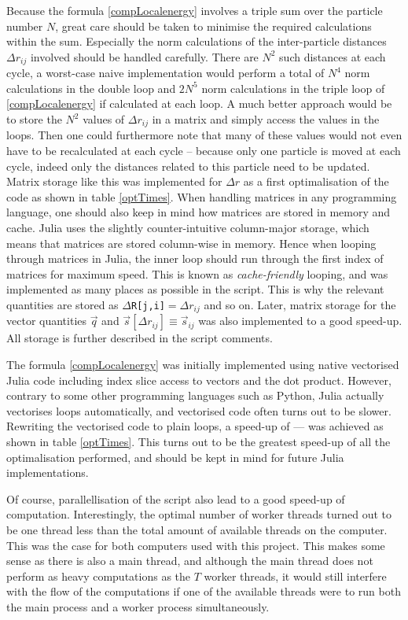 \documentclass[a4paper,8pt]{article}
\begin{document}
\begin{multicols}{2}
Because the formula \eqref{compLocalenergy} involves a triple sum over the particle number $N$, great care should be taken to minimise the required calculations within the sum. Especially the norm calculations of the inter-particle distances $\Delta r_{ij}$ involved should be handled carefully. There are $N^2$ such distances at each cycle, a worst-case naive implementation would perform a total of $N^4$ norm calculations in the double loop and $2N^5$ norm calculations in the triple loop of \eqref{compLocalenergy} if calculated at each loop. A much better approach would be to store the $N^2$ values of $\Delta r_{ij}$ in a matrix and simply access the values in the loops. Then one could furthermore note that many of these values would not even have to be recalculated at each cycle -- because only one particle is moved at each cycle, indeed only the distances related to this particle need to be updated. Matrix storage like this was implemented for $\Delta r$ as a first optimalisation of the code as shown in table \ref{optTimes}. When handling matrices in any programming language, one should also keep in mind how matrices are stored in memory and cache. Julia uses the slightly counter-intuitive column-major storage, which means that matrices are stored column-wise in memory. Hence when looping through matrices in Julia, the inner loop should run through the first index of matrices for maximum speed. This is known as \textit{cache-friendly} looping, and was implemented as many places as possible in the script. This is why the relevant quantities are stored as \texttt{$\Delta$R[j,i]}$ = \Delta{r}_{ij}$ and so on. Later, matrix storage for the vector quantities $\vec{q}$ and $\vec{s}[\Delta r_{ij}] \equiv \vec{s}_{ij}$ was also implemented to a good speed-up. All storage is further described in the script comments.

The formula \eqref{compLocalenergy} was initially implemented using native vectorised Julia code including index slice access to vectors and the dot product. However, contrary to some other programming languages such as Python, Julia actually vectorises loops automatically, and vectorised code often turns out to be slower. Rewriting the vectorised code to plain loops, a speed-up of --- was achieved as shown in table \ref{optTimes}. This turns out to be the greatest speed-up of all the optimalisation performed, and should be kept in mind for future Julia implementations.

Of course, parallellisation of the script also lead to a good speed-up of computation. Interestingly, the optimal number of worker threads turned out to be one thread less than the total amount of available threads on the computer. This was the case for both computers used with this project. This makes some sense as there is also a main thread, and although the main thread does not perform as heavy computations as the $T$ worker threads, it would still interfere with the flow of the computations if one of the available threads were to run both the main process and a worker process simultaneously.


\end{multicols}
\end{document}
